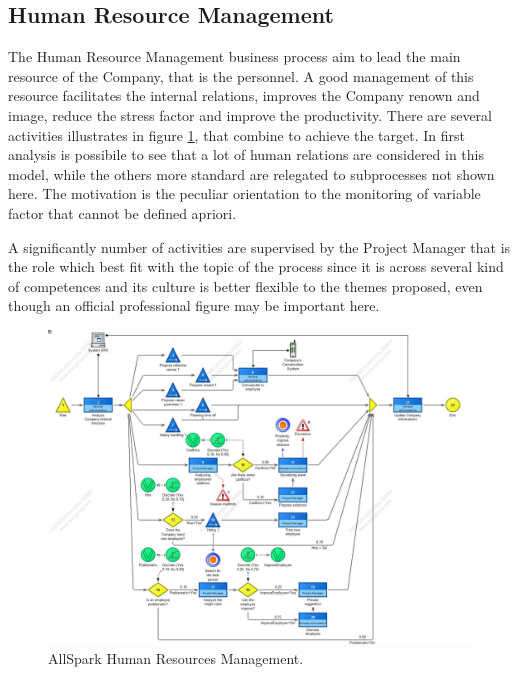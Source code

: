 \subsection{Human Resource Management}
The Human Resource Management business process aim to lead the main resource of the Company, that is the personnel. A good management of this resource facilitates the internal relations, improves the Company renown and image, reduce the stress factor and improve the productivity. There are several activities illustrates in figure \ref{2img:human_resources}, that combine to achieve the target. In first analysis is possibile to see that a lot of human relations are considered in this model, while the others more standard are relegated to subprocesses not shown here. The motivation is the peculiar orientation to the monitoring of variable factor that cannot be defined apriori.

A significantly number of activities are supervised by the Project Manager that is the role which best fit with the topic of the process since it is across several kind of competences and its culture is better flexible to the themes proposed, even though an official professional figure may be important here.

\begin{figure}[ht!]
\begin{centering}
\includegraphics[scale=0.35, angle=90]{assign2/adonis/imgs/human_resources.jpg}
\caption{AllSpark Human Resources Management.}
\label{2img:human_resources}
\end{centering}
\end{figure}


